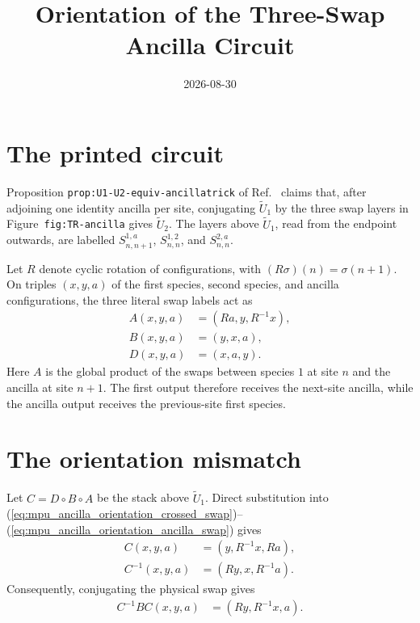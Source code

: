 \documentclass{article}
\title{Orientation of the Three-Swap Ancilla Circuit}
\author{}
\date{2026-08-30}
\begin{document}
\maketitle
{}

\section{The printed circuit}

Proposition \texttt{prop:U1-U2-equiv-ancillatrick} of
Ref.~\cite{Cirac2017MPU} claims that, after adjoining one identity ancilla per
site, conjugating $\widetilde U_1$ by the three swap layers in
Figure~\texttt{fig:TR-ancilla} gives $\widetilde U_2$. The layers above
$\widetilde U_1$, read from the endpoint outwards, are labelled
$S^{1,a}_{n,n+1}$, $S^{1,2}_{n,n}$, and $S^{2,a}_{n,n}$.

Let $R$ denote cyclic rotation of configurations, with
$(R\sigma)(n)=\sigma(n+1)$. On triples $(x,y,a)$ of the first species, second
species, and ancilla configurations, the three literal swap labels act as
\begin{align}
    A(x,y,a)
     & =(Ra,y,R^{-1}x),
    \label{eq:mpu_ancilla_orientation_crossed_swap}  \\
    B(x,y,a)
     & =(y,x,a),
    \label{eq:mpu_ancilla_orientation_physical_swap} \\
    D(x,y,a)
     & =(x,a,y).
    \label{eq:mpu_ancilla_orientation_ancilla_swap}
\end{align}
Here $A$ is the global product of the swaps between species $1$ at site $n$
and the ancilla at site $n+1$. The first output therefore receives the
next-site ancilla, while the ancilla output receives the previous-site first
species.

\section{The orientation mismatch}

Let $C=D\circ B\circ A$ be the stack above $\widetilde U_1$. Direct
substitution into (\ref{eq:mpu_ancilla_orientation_crossed_swap})--
(\ref{eq:mpu_ancilla_orientation_ancilla_swap}) gives
\begin{align}
    C(x,y,a)
     & =(y,R^{-1}x,Ra),
    \label{eq:mpu_ancilla_orientation_stack} \\
    C^{-1}(x,y,a)
     & =(Ry,x,R^{-1}a).
    \label{eq:mpu_ancilla_orientation_stack_inverse}
\end{align}
Consequently, conjugating the physical swap gives
\begin{align}
    C^{-1}BC(x,y,a)
     & =(Ry,R^{-1}x,a).
    \label{eq:mpu_ancilla_orientation_literal_endpoint}
\end{align}
\end{document}
